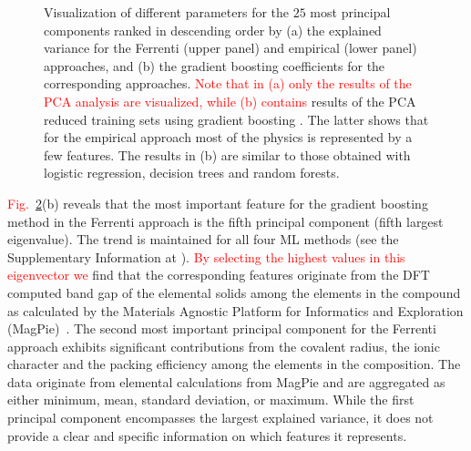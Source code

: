 \documentclass[superscriptaddress,unsortedaddress,
 amsmath,amssymb,
 aps,
]{revtex4-2}
\newcommand{\mrk}[1]{\textcolor{red}{#1}}
\begin{document}
\begin{figure}[t]
\begin{subfigure}[b]{0.45\textwidth}
        \label{fig:03-fi-d}
        \subcaption{}
    \end{subfigure}
    \caption{Visualization of different parameters for the $25$ most principal components ranked in descending order by (a) the explained variance for the Ferrenti (upper panel) and empirical (lower panel) approaches, and (b) the gradient boosting coefficients for the corresponding approaches. \mrk{Note that in (a) only the results of the PCA analysis are visualized, while (b) contains} results of the PCA reduced training sets using gradient boosting \cite{Hastie2009,xgboost2016}. The latter shows that for the empirical approach most of the physics is represented by a few features. The results in (b) are similar to those obtained with logistic regression, decision trees and random forests.  
    }
    \label{fig:PComponents}
\end{figure}

\mrk{Fig.}~\ref{fig:PComponents}(b) reveals that the most important feature for the gradient boosting method in the Ferrenti approach is the fifth principal component (fifth largest eigenvalue). The trend is maintained for all four ML methods (see the Supplementary Information at \cite{supplementary}). \mrk{By selecting the highest values in this eigenvector we} find that the corresponding features originate from the DFT computed band gap of the elemental solids among the elements in the compound as calculated by the Materials Agnostic Platform for Informatics and Exploration (MagPie)~\cite{magpie}. 
The second most important principal component for the Ferrenti approach exhibits significant contributions from the covalent radius, the ionic character and the packing efficiency among the elements in the composition. 
The data originate from elemental calculations from MagPie and are aggregated as either minimum, mean, standard deviation, or maximum. 
While the first principal component encompasses the largest explained variance, it does not provide a clear and specific information on which features it represents. 

\end{document}
